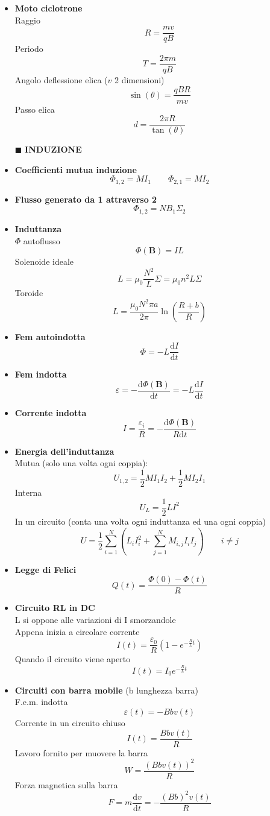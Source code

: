 \documentclass{book}
\newcommand{\g}{\textbf}
\newcommand{\h}{\mathbf}
\newcommand{\e}{\begin{equation}}
\newcommand{\ex}{\end{equation} }
\renewcommand{\it}{\item[$\cdot$]}
\begin{document}
\begin{multicols}{4}
\begin{itemize}
    
    \it \g{Moto ciclotrone} \\
        Raggio
        \e{R = \frac{mv}{qB}}\ex 
        Periodo 
        \e{T = \frac{2\pi m}{qB}}\ex 
        Angolo deflessione elica ($v$ 2 dimensioni) 
        \e{\sin(\theta) = \frac{qBR}{mv}}\ex 
        Passo elica 
        \e{d=\frac{2\pi R}{\tan(\theta)}} \ex

\item [$\blacksquare$] \g{INDUZIONE}
    \it \g{Coefficienti mutua induzione}
        \e{\Phi_{1,2}=MI_1 \qquad \Phi_{2,1}=MI_2} \ex
    \it \g{Flusso generato da 1 attraverso 2} 
        \e{\Phi_{1,2}=NB_1\Sigma_2} \ex
    \it \g{Induttanza}\\
        $\Phi$ autoflusso
        \e{\Phi(\h{B})=IL} \ex
        Solenoide ideale
        \e{L=\mu_0\frac{N^2}{L}\Sigma=\mu_0n^2L\Sigma}\ex
        Toroide 
        \e{L = \frac{\mu_0 N^2 \pi a}{2\pi} \ln\left(\frac{R+b}{R}\right)}\ex
    \it \g{Fem autoindotta}
        \e{\Phi=-L\frac{\mathrm{d}I}{\mathrm{d}t}} \ex
    \it \g{Fem indotta}
        \e{\varepsilon=-\frac{\mathrm{d}\Phi(\h{B})}{\mathrm{d}t}}=-L\frac{\mathrm{d}I}{\mathrm{d}t} \ex
    \it \g{Corrente indotta}
        \e{I=\frac{\varepsilon_i}{R}=-\frac{\mathrm{d}\Phi(\h{B})}{R\mathrm{d}t}} \ex
    \it \g{Energia dell'induttanza} \\
        Mutua (solo una volta ogni coppia):
        \e{U_{1,2}=\frac{1}{2}MI_1I_2+\frac{1}{2}MI_2I_1}\ex
        Interna
        \e{U_L=\frac{1}{2}LI^2} \ex
        In un circuito (conta una volta ogni induttanza ed una ogni coppia)
        \e{U=\frac{1}{2}\sum_{i=1}^N(L_iI_i^2+\sum_{j=1}^N M_{i,j}I_iI_j) \qquad i\neq j} \ex
    \it \g{Legge di Felici}
        \e{Q(t)=\frac{\Phi(0)-\Phi(t)}{R}} \ex
    \it \g{Circuito RL in DC}\\
        L si oppone alle variazioni di I smorzandole \\
        Appena inizia a circolare corrente \\
        \e{I(t)=\frac{\varepsilon_0}{R}(1-e^{-\frac{R}{L}t})} \ex
        Quando il circuito viene aperto \\
        \e{I(t)=I_0 e^{-\frac{R}{L}t}} \ex
    \it \g{Circuiti con barra mobile} (b lunghezza barra) \\
        F.e.m. indotta
        \e{\varepsilon(t)=-Bbv(t)}\ex
        Corrente in un circuito chiuso
        \e{I(t)=\frac{Bbv(t)}{R}}\ex
        Lavoro fornito per muovere la barra
        \e{W=\frac{(Bbv(t))^2}{R}}\ex
        Forza magnetica sulla barra
        \e{F=m\frac{\mathrm{d}v}{\mathrm{d}t}=-\frac{(Bb)^2v(t)}{R}} \ex

\end{itemize}
\end{multicols}
\end{document}
